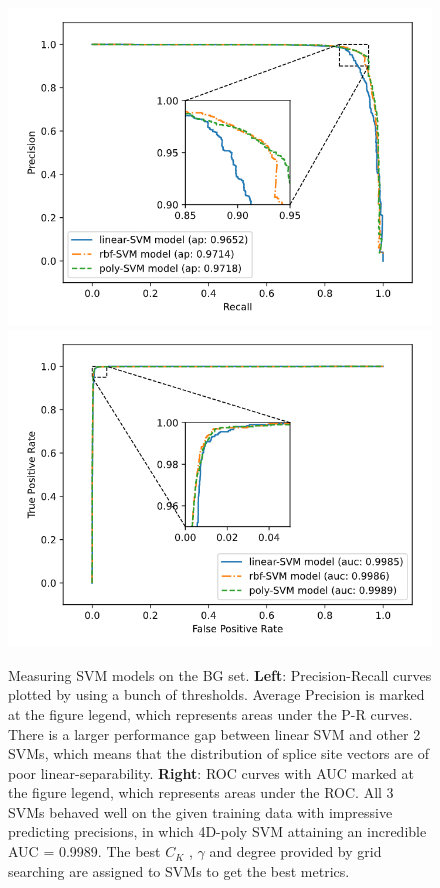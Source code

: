\documentclass[journal,twoside]{IEEEtran}
\begin{document}
\begin{figure}[htbp]
\centerline{\includegraphics[scale=0.35]{Pics/SVM_prcurve_donor.png}
    \includegraphics[scale=0.35]{Pics/SVM_roccurve_donor.png}}
\caption{Measuring SVM models on the BG set. \textbf{Left}: Precision-Recall curves plotted by using a bunch of thresholds. Average Precision is marked at the figure legend, which represents areas under the P-R curves. There is a larger performance gap between linear SVM and other 2 SVMs, which means that the distribution of splice site vectors are of poor linear-separability. \textbf{Right}: ROC curves with AUC marked at the figure legend, which represents areas under the ROC. All 3 SVMs behaved well on the given training data with impressive predicting precisions, in which 4D-poly SVM attaining an incredible AUC = 0.9989. The best $C_K$ , $\gamma$ and degree provided by grid searching are assigned to SVMs to get the best metrics. }
\label{fig3}
\end{figure}
\end{document}
